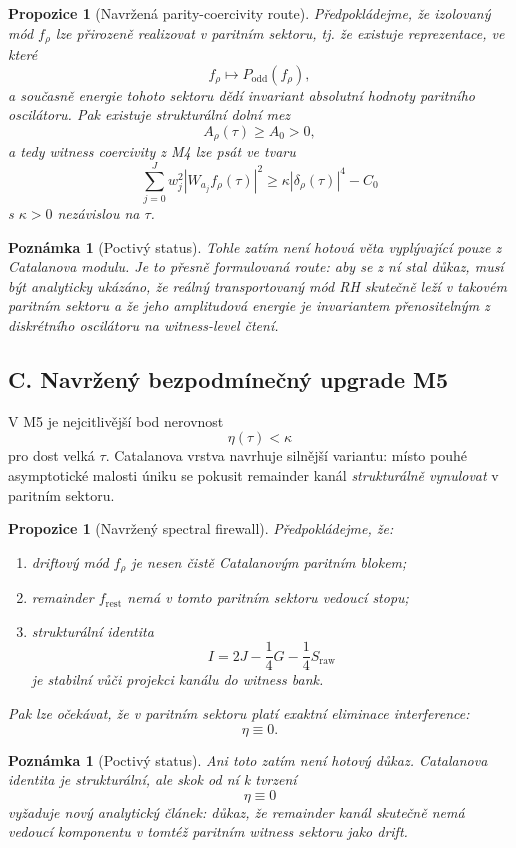 \documentclass[11pt,a4paper]{article}
\newtheorem{remark}[theorem]{Poznámka}
\newtheorem{proposition}[theorem]{Propozice}
\begin{document}
\begin{proposition}[Navržená parity-coercivity route]
Předpokládejme, že izolovaný mód \(f_\rho\) lze přirozeně realizovat v paritním sektoru,
tj. že existuje reprezentace, ve které
\[
f_\rho \longmapsto P_{\mathrm{odd}}(f_\rho),
\]
a současně energie tohoto sektoru dědí invariant absolutní hodnoty paritního oscilátoru.
Pak existuje strukturální dolní mez
\[
A_\rho(\tau)\ge A_0>0,
\]
a tedy witness coercivity z M4 lze psát ve tvaru
\[
\sum_{j=0}^{J} w_j^2 |W_{a_j}f_\rho(\tau)|^2
\ge
\kappa |\delta_\rho(\tau)|^4-C_0
\]
s \(\kappa>0\) nezávislou na \(\tau\).
\end{proposition}

\begin{remark}[Poctivý status]
Tohle zatím není hotová věta vyplývající pouze z Catalanova modulu. Je to přesně formulovaná
\emph{route}: aby se z ní stal důkaz, musí být analyticky ukázáno, že reálný transportovaný mód
RH skutečně leží v takovém paritním sektoru a že jeho amplitudová energie je invariantem
přenositelným z diskrétního oscilátoru na witness-level čtení.
\end{remark}

\subsection*{C. Navržený bezpodmínečný upgrade M5}

V M5 je nejcitlivější bod nerovnost
\[
\eta(\tau)<\kappa
\]
pro dost velká \(\tau\). Catalanova vrstva navrhuje silnější variantu: místo pouhé asymptotické
malosti úniku se pokusit remainder kanál \emph{strukturálně vynulovat} v paritním sektoru.

\begin{proposition}[Navržený spectral firewall]
Předpokládejme, že:
\begin{enumerate}[label=\textbf{(\arabic*)}]
\item driftový mód \(f_\rho\) je nesen čistě Catalanovým paritním blokem;
\item remainder \(f_{\mathrm{rest}}\) nemá v tomto paritním sektoru vedoucí stopu;
\item strukturální identita
\[
I=2J-\frac14 G-\frac14 S_{\mathrm{raw}}
\]
je stabilní vůči projekci kanálu do witness bank.
\end{enumerate}
Pak lze očekávat, že v paritním sektoru platí exaktní eliminace interference:
\[
\eta\equiv 0.
\]
\end{proposition}

\begin{remark}[Poctivý status]
Ani toto zatím není hotový důkaz. Catalanova identita je strukturální, ale skok od ní k tvrzení
\[
\eta\equiv 0
\]
vyžaduje nový analytický článek: důkaz, že remainder kanál skutečně nemá vedoucí komponentu
v tomtéž paritním witness sektoru jako drift.
\end{remark}
\end{document}
